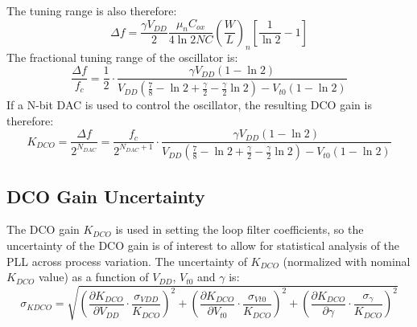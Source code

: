 \documentclass[10pt,a4paper]{article}
\begin{document}
	The tuning range is also therefore:
	\begin{equation}
		\Delta f = \frac{\gamma V_{DD}}{2}\frac{\mu_nC_{ox}}{4\ln2NC}\left(\frac{W}{L}\right)_n\left[\frac{1}{\ln2}-1\right]
	\end{equation}
	The fractional tuning range of the oscillator is:
	\begin{equation}
		\frac{\Delta f}{f_c} = \frac{1}{2}\cdot\frac{\gamma V_{DD}\left( 1-\ln2 \right)}{V_{DD}\left(\frac{7}{8}-\ln2+\frac{\gamma}{2}-\frac{\gamma}{2}\ln2\right)-V_{t0}\left(1-\ln2\right)}
	\end{equation}	
	If a N-bit DAC is used to control the oscillator, the resulting DCO gain is therefore:
	\begin{equation}
		K_{DCO} = \frac{\Delta f}{2^{N_{DAC}}} = \frac{f_c}{2^{N_{DAC}+1}}\cdot\frac{\gamma V_{DD}\left( 1-\ln2 \right)}{V_{DD}\left(\frac{7}{8}-\ln2+\frac{\gamma}{2}-\frac{\gamma}{2}\ln2\right)-V_{t0}\left(1-\ln2\right)}
	\end{equation}	
	\subsection{DCO Gain Uncertainty}
	The DCO gain $K_{DCO}$ is used in setting the loop filter coefficients, so the uncertainty of the DCO gain is of interest to allow for statistical analysis of the PLL across process variation. The uncertainty of $K_{DCO}$ (normalized with nominal $K_{DCO}$ value) as a function of $V_{DD}$, $V_{t0}$ and $\gamma$ is:
	\begin{equation}
		\sigma_{KDCO} = \sqrt{\left(\frac{\partial K_{DCO}}{\partial V_{DD}}\cdot\frac{\sigma_{VDD}}{K_{DCO}} \right)^2 + \left(\frac{\partial K_{DCO}}{\partial V_{t0}}\cdot\frac{\sigma_{Vt0}}{K_{DCO}} \right)^2 + \left(\frac{\partial K_{DCO}}{\partial \gamma}\cdot\frac{\sigma_\gamma}{K_{DCO}} \right)^2}
	\end{equation}
\end{document}
